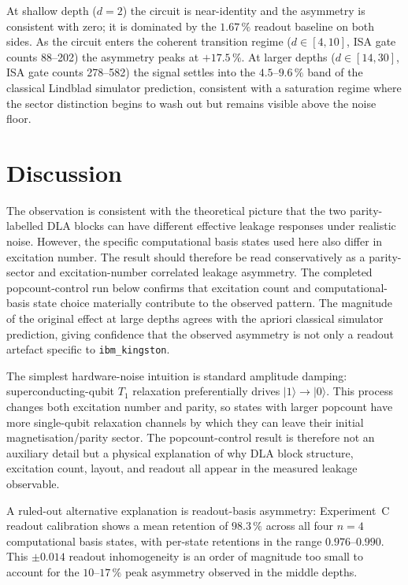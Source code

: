 \documentclass[reprint,aps,physrev,superscriptaddress,floatfix,longbibliography]{revtex4-2}
\begin{document}
At shallow depth ($d = 2$) the circuit is near-identity and the
asymmetry is consistent with zero; it is dominated by the $1.67\,\%$
readout baseline on both sides. As the circuit enters the coherent
transition regime ($d \in [4, 10]$, ISA gate counts 88--202) the
asymmetry peaks at $+17.5\,\%$. At larger depths ($d \in [14, 30]$,
ISA gate counts 278--582) the signal settles into the
$4.5$--$9.6\,\%$ band of the classical Lindblad simulator prediction,
consistent with a saturation regime where the sector distinction
begins to wash out but remains visible above the noise floor.

\section{Discussion}

The observation is consistent with the theoretical picture that the
two parity-labelled DLA blocks can have different effective leakage
responses under realistic noise. However, the specific computational
basis states used here also differ in excitation number. The result
should therefore be read conservatively as a parity-sector and
excitation-number correlated leakage asymmetry. The completed
popcount-control run below confirms that excitation count and
computational-basis state choice materially contribute to the
observed pattern. The magnitude of the original effect at large
depths agrees with the apriori classical simulator prediction, giving
confidence that the observed asymmetry is not only a readout artefact
specific to \texttt{ibm\_kingston}.

The simplest hardware-noise intuition is standard amplitude damping:
superconducting-qubit $T_1$ relaxation preferentially drives
$|1\rangle\rightarrow |0\rangle$. This process changes both
excitation number and parity, so states with larger popcount have more
single-qubit relaxation channels by which they can leave their initial
magnetisation/parity sector. The popcount-control result is therefore
not an auxiliary detail but a physical explanation of why DLA block
structure, excitation count, layout, and readout all appear in the
measured leakage observable.

A ruled-out alternative explanation is readout-basis asymmetry:
Experiment~C readout calibration shows a mean retention of
$98.3\,\%$ across all four $n = 4$ computational basis states, with
per-state retentions in the range $0.976$--$0.990$. This
$\pm 0.014$ readout inhomogeneity is an order of magnitude too small
to account for the $10$--$17\,\%$ peak asymmetry observed in the
middle depths.
\end{document}
